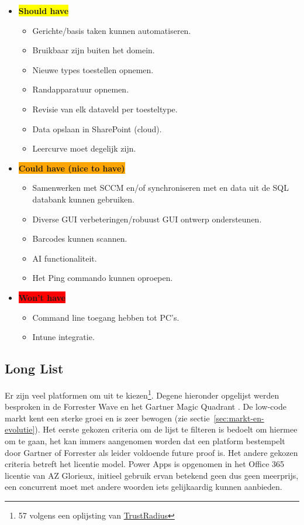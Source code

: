 \begin{itemize}
\begin{itemize}
    \end{itemize}
    \item \textbf{\colorbox{yellow}{Should have}}
    \begin{itemize}
        \item Gerichte/basis taken kunnen automatiseren.
        \item Bruikbaar zijn buiten het domein.
        \item Nieuwe types toestellen opnemen.
        \item Randapparatuur opnemen.
        \item Revisie van elk dataveld per toesteltype.
        \item Data opslaan in SharePoint (cloud).
        \item Leercurve moet degelijk zijn.
    \end{itemize}
    \item \textbf{\colorbox{orange}{Could have (nice to have)}}
    \begin{itemize}
        \item Samenwerken met SCCM en/of synchroniseren met en data uit de SQL databank kunnen gebruiken.
        \item Diverse GUI verbeteringen/robuust GUI ontwerp ondersteunen.
        \item Barcodes kunnen scannen.
        \item AI functionaliteit.
        \item Het Ping commando kunnen oproepen.
    \end{itemize}
    \item \textbf{\colorbox{red}{Won't have}}
    \begin{itemize}
        \item Command line toegang hebben tot PC's.
        \item Intune integratie.
    \end{itemize}
\end{itemize}

\subsection{Long List}

Er zijn veel platformen om uit te kiezen\footnote{ 57 volgens een oplijsting van \href{https://www.trustradius.com/low-code-development}{TrustRadius}}. Degene hieronder opgelijst werden besproken in de Forrester Wave \autocite{Rymer2019} en het Gartner Magic Quadrant \autocite{Vincent2019}. De low-code markt kent een sterke groei en is zeer bewogen (zie sectie~\ref{sec:markt-en-evolutie}). Het eerste gekozen criteria om de lijst te filteren is bedoelt om hiermee om te gaan, het kan immers aangenomen worden dat een platform bestempelt door Gartner of Forrester als leider voldoende future proof is. Het andere gekozen criteria betreft het licentie model. Power Apps is opgenomen in het Office 365 licentie van AZ Glorieux, initieel gebruik ervan betekend geen dus geen meerprijs, een concurrent moet met andere woorden iets gelijkaardig kunnen aanbieden.

